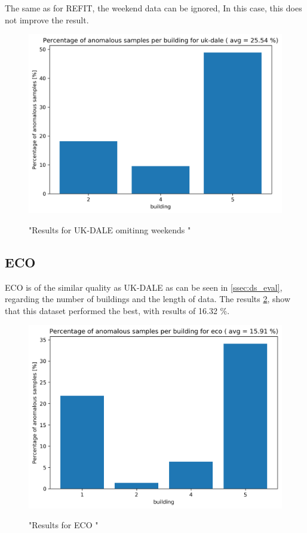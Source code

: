 The same as for REFIT, the weekend data can be ignored,
In this case, this does not improve the result. 

\begin{figure}[H]
	\centering
	\caption{"Results for UK-DALE omitinng weekends  "}
	\includegraphics[width=1\textwidth]{Figures/EC/ukdale_nw_res.png}
	\label{fig:ukdale_res_nw}
\end{figure}

\subsection{ECO}

ECO is of the similar quality as UK-DALE as can be seen in \ref{ssec:ds_eval}, regarding the number of buildings and the length of data.
The results \ref{fig:eco_res}, show that this dataset performed the best, with results of 16.32 \%.

\begin{figure}[H]
	\centering
	\caption{"Results for ECO "}
	\includegraphics[width=.8\textwidth]{Figures/EC/eco_res_nw_1.png}
	\label{fig:eco_res}
\end{figure}

